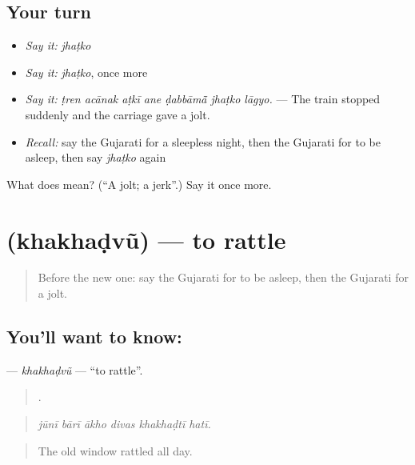 \subsection*{Your turn}
\begin{itemize}
\raggedright
  \item \emph{Say it:} \emph{jhaṭko}
  \item \emph{Say it:} \emph{jhaṭko}, once more
  \item \emph{Say it:} \emph{ṭren acānak aṭkī ane ḍabbāmā̃ jhaṭko lāgyo.} — The train stopped suddenly and the carriage gave a jolt.
  \item \emph{Recall:} say the Gujarati for a sleepless night, then the Gujarati for to be asleep, then say \emph{jhaṭko} again
\end{itemize}

\begin{tcolorbox}[breakable,colback=teal!4,colframe=teal!35!black,title={Before you move on}]
What does  mean? (\textquotedblleft{}A jolt; a jerk\textquotedblright{}.) Say it once more.
\end{tcolorbox}
\section[\texorpdfstring{\gu{ખખડવું} (khakhaḍvũ)}{ખખડવું (khakhaḍvũ)}]{ (khakhaḍvũ) — to rattle}

\label{lesson:GU-C398-khakhadvu}



\begin{quote}
Before the new one: say the Gujarati for to be asleep, then the Gujarati for a jolt.
\end{quote}

\subsection*{You'll want to know: }
\textbf{} — \emph{khakhaḍvũ} — \textquotedblleft{}to rattle\textquotedblright{}.

\begin{quote}
     .
\end{quote}

\begin{quote}
\emph{jūnī bārī ākho divas khakhaḍtī hatī.}
\end{quote}

\begin{quote}
The old window rattled all day.
\end{quote}

